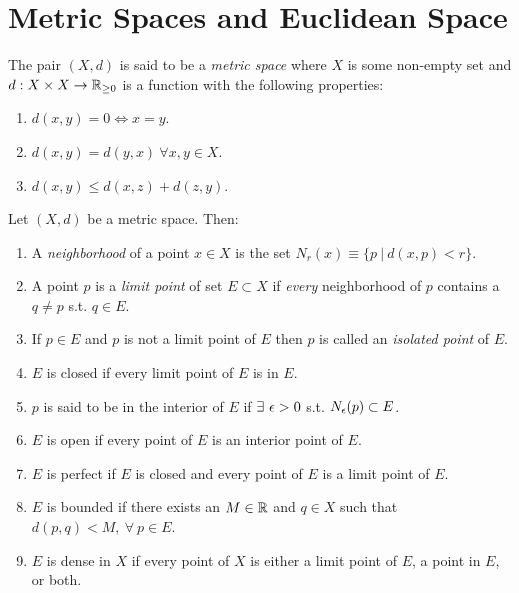 \section{Metric Spaces and Euclidean Space}
\begin{definition}
  The pair $(X,d)$ is said to be a \textit{metric space} where $X$ is some non-empty set and $d:X\times X\to \mathbb{R}_{\geq 0}$ is a function with the following properties:
\begin{enumerate}
  \item $d(x,y) = 0 \iff x = y$.
  \item $d(x,y) = d(y,x)\ \forall x,y\in X$.
  \item $d(x,y) \leq d(x,z) + d(z,y)$.
\end{enumerate}
\end{definition}
\begin{definition}
  Let $(X,d)$ be a metric space. Then:
  \begin{enumerate}
    \item A \textit{neighborhood} of a point $x\in X$ is the set $N_r(x) \equiv \{p\ |\ d(x,p) <r\}$.
    \item A point $p$ is a \textit{limit point} of set $E\subset X$ if \textit{every} neighborhood of $p$ contains a $q\neq p$ s.t. $q\in E$.
    \item If $p\in E$ and $p$ is not a limit point of $E$ then $p$ is called an \textit{isolated point} of $E$.
    \item $E$ is closed if every limit point of $E$ is in $E$.
    \item $p$ is said to be in the interior of $E$ if $\exists\ \epsilon>0$ s.t. $N_\epsilon(p)\subset E$.
    \item $E$ is open if every point of $E$ is an interior point of $E$.
    \item $E$ is perfect if $E$ is closed and every point of $E$ is a limit point of $E$.
    \item $E$ is bounded if there exists an $M\in \mathbb{R}$ and $q\in X$ such that $d(p,q) < M,\ \forall\ p\in E$.
    \item $E$ is dense in $X$ if every point of $X$ is either a limit point of $E$, a point in $E$, or both.
  \end{enumerate}
\end{definition}
